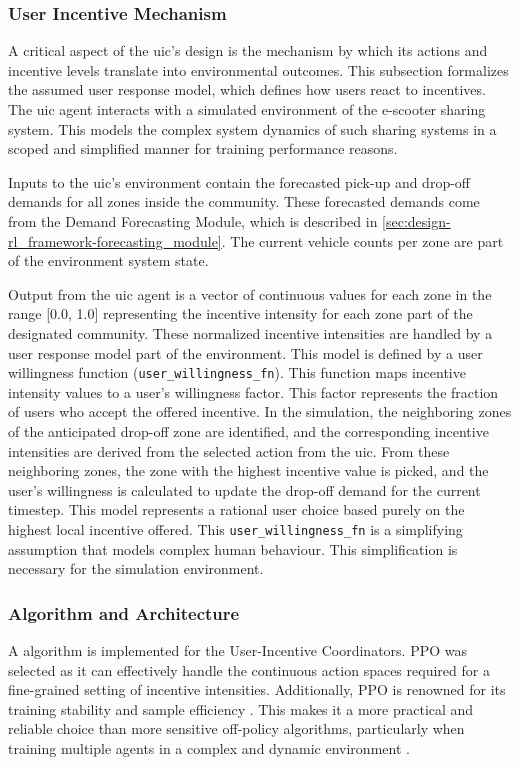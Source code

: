 \subsubsection{User Incentive Mechanism}
A critical aspect of the \gls{uic}'s design is the mechanism by which its actions and incentive levels translate into environmental outcomes.
This subsection formalizes the assumed user response model, which defines how users react to incentives.
The \gls{uic} agent interacts with a simulated environment of the e-scooter sharing system.
This models the complex system dynamics of such sharing systems in a scoped and simplified manner for training performance reasons.

Inputs to the \gls{uic}'s environment contain the forecasted pick-up and drop-off demands for all zones inside the community.
These forecasted demands come from the Demand Forecasting Module, which is described in \autoref{sec:design-rl_framework-forecasting_module}.
The current vehicle counts per zone are part of the environment system state.

Output from the \gls{uic} agent is a vector of continuous values for each zone in the range [0.0, 1.0] representing the incentive intensity for each zone part of the designated community.
These normalized incentive intensities are handled by a user response model part of the environment.
This model is defined by a user willingness function (\texttt{user\_willingness\_fn}).
This function maps incentive intensity values to a user's willingness factor.
This factor represents the fraction of users who accept the offered incentive.
In the simulation, the neighboring zones of the anticipated drop-off zone are identified, and the corresponding incentive intensities are derived from the selected action from the \gls{uic}.
From these neighboring zones, the zone with the highest incentive value is picked, and the user's willingness is calculated to update the drop-off demand for the current timestep.
This model represents a rational user choice based purely on the highest local incentive offered.
This \texttt{user\_willingness\_fn} is a simplifying assumption that models complex human behaviour.
This simplification is necessary for the simulation environment.

\subsubsection{Algorithm and Architecture}
A  \cite{schulman_proximal_2017} algorithm is implemented for the User-Incentive Coordinators.
PPO was selected as it can effectively handle the continuous action spaces required for a fine-grained setting of incentive intensities.
Additionally, PPO is renowned for its training stability and sample efficiency \cite{schulman_proximal_2017}.
This makes it a more practical and reliable choice than more sensitive off-policy algorithms, particularly when training multiple agents in a complex and dynamic environment \cite{schulman_high-dimensional_2018}.


